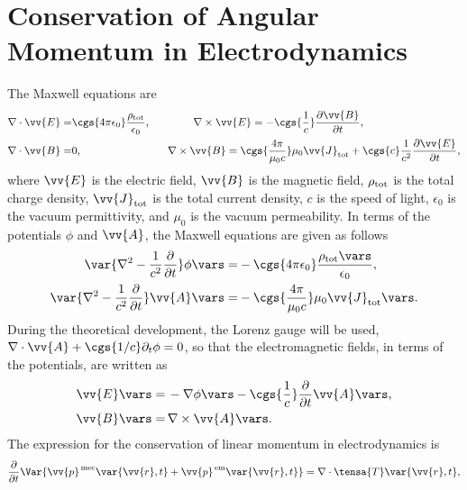 \section{Conservation of Angular Momentum in Electrodynamics}
The Maxwell equations are \cite{jackson}
\begin{align}
\nabla\cdot\vv{E} =& \cgs{4\pi\epsilon_0}\frac{\rho_{\text{tot}}}{\epsilon_0}, \qquad \qquad \nabla\times\vv{E}=-\cgs{\frac{1}{c}}\frac{\partial\vv{B}}{\partial t}, \nonumber \\
\nabla\cdot\vv{B} =& 0, \qquad \qquad \qquad \qquad \nabla\times\vv{B}=\cgs{\frac{4\pi}{\mu_0 c}}\mu_0\vv{J}_{\text{tot}}+\cgs{c}\frac{1}{c^2}\frac{\partial\vv{E}}{\partial t},
\label{eq: Maxwell equations}
\end{align}
where $\vv{E}$ is the electric field, $\vv{B}$ is the magnetic field, $\rho_{\rm tot}$ is the total charge density, $\vv{J}_{\rm tot}$ is the total current density, $c$ is the speed of light, $\epsilon_0$ is the vacuum permittivity, and $\mu_0$ is the vacuum permeability. In terms of the potentials $\phi$ and $\vv{A}$, the Maxwell equations are given as follows \cite{jackson}
\begin{align}
\var{\nabla^2 -\frac{1}{c^2}\frac{\partial}{\partial t}}\phi\vars =& - \cgs{4\pi\epsilon_0} \frac{\rho_{\text{tot}}\vars}{\epsilon_0}, \label{eq: scalar potential}\\
\var{\nabla^2 -\frac{1}{c^2}\frac{\partial}{\partial t}}\vv{A}\vars =& - \cgs{\frac{4\pi}{\mu_0 c}}\mu_0 \vv{J}_{\text{tot}}\vars.\label{eq: vector potential}
\end{align}
During the theoretical development, the Lorenz gauge will be used, $\nabla\cdot\vv{A}+\cgs{1/c}\partial_t \phi =0$, so that the electromagnetic fields, in terms of the potentials, are written as
\begin{align}
\vv{E}\vars =& \, -\nabla\phi\vars - \cgs{\frac{1}{c}}\frac{\partial}{\partial t}\vv{A}\vars, \label{eq: E field potentials}\\
\vv{B}\vars =& \, \nabla\times\vv{A}\vars. \label{eq: B field potentials}
\end{align}
The expression for the conservation of linear momentum in electrodynamics is \cite{jackson}
\begin{equation}
\frac{\partial}{\partial t} \Var{\vv{p}^{\rm \, mec}\var{\vv{r},t}+\vv{p}^{\rm \, em}\var{\vv{r},t}} = \nabla \cdot \tensa{T}\var{\vv{r},t},
\label{eq: cons momento lineal}
\end{equation}
